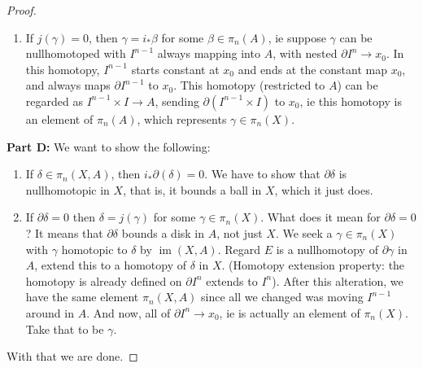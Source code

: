 \begin{proof}
\begin{enumerate}[label=(\roman*)]
            \item If $j(\gamma)=0 $, then $\gamma=i_* \beta $ for some $\beta \in \pi_n (A)$, ie suppose $\gamma$ can be nullhomotoped with $I^{n-1}$ always mapping into $A$, with nested $\partial  I^n \to x_0$. In this homotopy, $I^{n-1}$ starts constant at $x_0$ and ends at the constant map $x_0$, and always maps $\partial  I^{n-1}$ to $x_0$. This homotopy (restricted to $A$) can be regarded as $I^{n-1}\times I\to A$, sending $\partial (I^{n-1}\times I)$ to $x_0$, ie this homotopy is an element of $\pi_n (A)$, which represents $\gamma \in \pi_n (X)$.
    \end{enumerate}
\noindent \textbf{Part D:} We want to show the following:
    \begin{enumerate}[label=(\roman*)]
        \item If $\delta \in \pi_n (X,A)$, then $i_* \partial (\delta)=0$. We have to show that $\partial \delta$ is nullhomotopic in $X$, that is, it bounds a ball in $X$, which it just does.
        \item If $\partial \delta=0$ then $\delta= j(\gamma)$ for some $\gamma \in \pi_n (X)$. What does it mean for $\partial \delta=0$? It means that $\partial \delta$ bounds a disk in $A$, not just $X$. We seek a $\gamma \in \pi_n (X)$ with $\gamma$ homotopic to $\delta$ by $\operatorname{im}(X,A)$. Regard $E$ is a nullhomotopy of $\partial \gamma $ in $A$, extend this to a homotopy of $\delta $ in $X$. (Homotopy extension property: the homotopy is already defined on $\partial I^n $ extends to $I^n $). After this alteration, we have the same element $\pi_n (X,A)$ since all we changed was moving $I^{n-1}$ around in $A$. And now, all of $\partial  I^n  \to x_0$, ie is actually an element of $\pi_n (X)$. Take that to be $\gamma$.
    \end{enumerate}
    With that we are done.
\end{proof}
